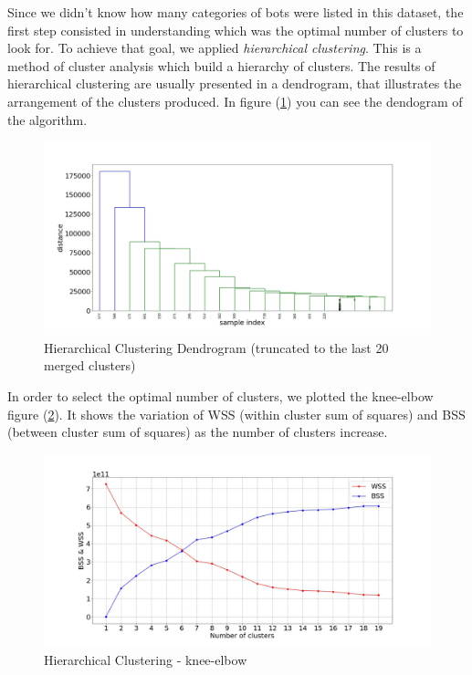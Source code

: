 \normalsize
\clearpage

Since we didn't know how many categories of bots were listed in this dataset, the first step consisted in understanding which was the optimal number of clusters to look for. To achieve that goal, we applied \textit{hierarchical clustering}. This is a method of cluster analysis which build a hierarchy of clusters. The results of hierarchical clustering are usually presented in a dendrogram, that illustrates the arrangement of the clusters produced.
In figure (\ref{fig:dendogram}) you can see the dendogram of the algorithm.


\begin{figure}
	\includegraphics[width=\linewidth]{chapter3/figure/dendogram.jpg}
	\caption{Hierarchical Clustering Dendrogram (truncated to the last 20 merged clusters)}
	\label{fig:dendogram}
\end{figure}

In order to select the optimal number of clusters, we plotted the knee-elbow figure (\ref{fig:kneeelbow}). It shows the variation of WSS (within cluster sum of squares) and BSS (between cluster sum of squares) as the number of clusters increase.\\

\begin{figure} [htp!]
	\includegraphics[width=\linewidth]{chapter3/figure/kneeelbow.jpg}
	\caption{Hierarchical Clustering - knee-elbow}
	\label{fig:kneeelbow}
\end{figure}

